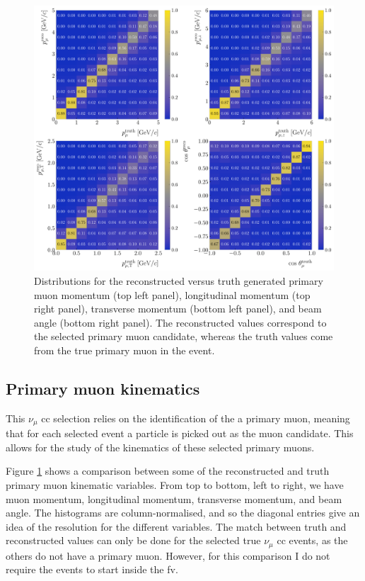 \begin{figure}[t]
    \centering
    \includegraphics[width=.99\linewidth]{Images/GAr_selection/numuCC_muon_kinematic_comp.pdf}
    \caption[Distributions for the reconstructed versus truth primary muon momentum, longitudinal momentum, transverse momentum, and angle.]{Distributions for the reconstructed versus truth generated primary muon momentum (top left panel), longitudinal momentum (top right panel), transverse momentum (bottom left panel), and beam angle (bottom right panel). The reconstructed values correspond to the selected primary muon candidate, whereas the truth values come from the true primary muon in the event.}
    \label{fig:numuCC_muon_kinematic_comp}
\end{figure}

\subsection{Primary muon kinematics}

This $\nu_{\mu}$ \gls{cc} selection relies on the identification of the a primary muon, meaning that for each selected event a particle is picked out as the muon candidate. This allows for the study of the kinematics of these selected primary muons.

Figure \ref{fig:numuCC_muon_kinematic_comp} shows a comparison between some of the reconstructed and truth primary muon kinematic variables. From top to bottom, left to right, we have muon momentum, longitudinal momentum, transverse momentum, and beam angle. The histograms are column-normalised, and so the diagonal entries give an idea of the resolution for the different variables. The match between truth and reconstructed values can only be done for the selected true $\nu_{\mu}$ \gls{cc} events, as the others do not have a primary muon. However, for this comparison I do not require the events to start inside the \gls{fv}.

